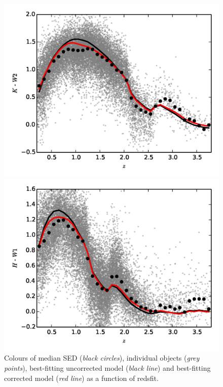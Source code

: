 \begin{figure}
\begin{minipage}[b]{0.49\textwidth}
    \includegraphics[width=\textwidth]{figures/chapter06/kw2.jpg}
  \end{minipage}
  \begin{minipage}[b]{0.49\textwidth}
    \includegraphics[width=\textwidth]{figures/chapter06/hw1.jpg}
  \end{minipage} 
  \caption{Colours of median SED ({\it black circles}), individual objects ({\it grey points}), best-fitting uncorrected model ({\it black line}) and best-fitting corrected model ({\it red line}) as a function of redsfit.}
  \label{fig:colorplots}
\end{figure}

